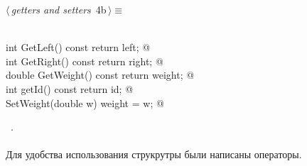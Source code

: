 \documentclass[12pt]{article}
\begin{document}
\begin{flushleft} \small
\begin{minipage}{\linewidth}\label{scrap3}\raggedright\small
{} $\langle\,${\itshape getters and setters}\nobreak\ {\footnotesize {4b}}$\,\rangle\equiv$
\vspace{-1ex}
\begin{list}{}{} \item
\mbox{}\verb@@\\
\mbox{}\verb@const int GetLeft() const { return left; }@\\
\mbox{}\verb@const int GetRight() const { return right; }@\\
\mbox{}\verb@const double GetWeight() const { return weight; }@\\
\mbox{}\verb@const int getId() const { return id; }@\\
\mbox{}\verb@void SetWeight(double w) { weight = w; }@\\
\mbox{}\verb@@{\NWsep}
\end{list}
\vspace{-1.5ex}
\footnotesize
\begin{list}{}{\setlength{\itemsep}{-\parsep}\setlength{\itemindent}{-\leftmargin}}
\item \NWtxtMacroRefIn\ .

\item{}
\end{list}
\end{minipage}\vspace{4ex}
\end{flushleft}
\paragraph{}
Для удобства использования струкрутры были написаны операторы.
\end{document}
